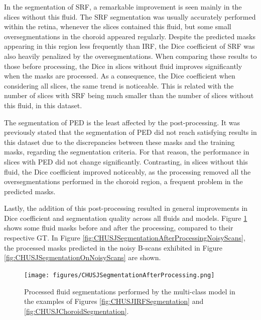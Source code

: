\par
In the segmentation of SRF, a remarkable improvement is seen mainly in the slices without this fluid. The SRF segmentation was usually accurately performed within the retina, whenever the slices contained this fluid, but some small oversegmentations in the choroid appeared regularly. Despite the predicted masks appearing in this region less frequently than IRF, the Dice coefficient of SRF was also heavily penalized by the oversegmentations. When comparing these results to those before processing, the Dice in slices without fluid improves significantly when the masks are processed. As a consequence, the Dice coefficient when considering all slices, the same trend is noticeable. This is related with the number of slices with SRF being much smaller than the number of slices without this fluid, in this dataset.
\par
The segmentation of PED is the least affected by the post-processing. It was previously stated that the segmentation of PED did not reach satisfying results in this dataset due to the discrepancies between these masks and the training masks, regarding the segmentation criteria. For that reason, the performance in slices with PED did not change significantly. Contrasting, in slices without this fluid, the Dice coefficient improved noticeably, as the processing removed all the oversegmentations performed in the choroid region, a frequent problem in the predicted masks.
\par
Lastly, the addition of this post-processing resulted in general improvements in Dice coefficient and segmentation quality across all fluids and models. Figure \ref{fig:CHUSJSegmentationAfterProcessing} shows some fluid masks before and after the processing, compared to their respective GT. In Figure \ref{fig:CHUSJSegmentationAfterProcessingNoisyScans}, the processed masks predicted in the noisy B-scans exhibited in Figure \ref{fig:CHUSJSegmentationOnNoisyScans} are shown.

\begin{figure}[!ht]
	\centering	\texttt{[image: figures/CHUSJSegmentationAfterProcessing.png]}
	\caption{Processed fluid segmentations performed by the multi-class model in the examples of Figures \ref{fig:CHUSJIRFSegmentation} and \ref{fig:CHUSJChoroidSegmentation}.}
	\label{fig:CHUSJSegmentationAfterProcessing}
\end{figure}

